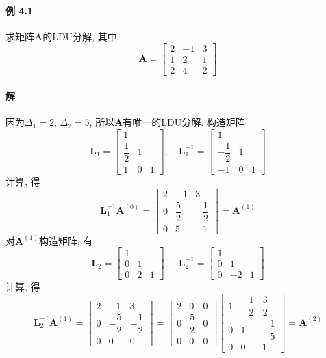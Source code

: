 \documentclass[12pt, a4paper, oneside, fontset=none]{ctexart}
\begin{document}
\paragraph*{例 4.1} 求矩阵$\bm{A}$的LDU分解, 其中
\[
    \bm{A} = \begin{bmatrix}
        2 & -1 & 3 \\
        1 & 2  & 1 \\
        2 & 4  & 2
    \end{bmatrix}
\]

\paragraph*{解} 因为$\Delta_1 = 2$, $\Delta_2 = 5$, 所以$\bm{A}$有唯一的LDU分解. 构造矩阵
\[
    \bm{L}_1 = \begin{bmatrix}
        1            &   &   \\
        \dfrac{1}{2} & 1 &   \\
        1            & 0 & 1
    \end{bmatrix}, \quad \bm{L}_1^{-1} = \begin{bmatrix}
        1             &   &   \\
        -\dfrac{1}{2} & 1 &   \\
        -1            & 0 & 1
    \end{bmatrix}
\]
计算, 得
\[
    \bm{L}_1^{-1}\bm{A}^{(0)} = \begin{bmatrix}
        2 & -1           & 3             \\
        0 & \dfrac{5}{2} & -\dfrac{1}{2} \\
        0 & 5            & -1
    \end{bmatrix} = \bm{A}^{(1)}
\]
对$\bm{A}^{(1)}$构造矩阵, 有
\[
    \bm{L}_2 = \begin{bmatrix}
        1 &   &   \\
        0 & 1 &   \\
        0 & 2 & 1
    \end{bmatrix}, \quad \bm{L}_2^{-1} = \begin{bmatrix}
        1 &    &   \\
        0 & 1  &   \\
        0 & -2 & 1
    \end{bmatrix}
\]
计算, 得
\[
    \bm{L}_2^{-1}\bm{A}^{(1)} = \begin{bmatrix}
        2 & -1            & 3             \\
        0 & -\dfrac{5}{2} & -\dfrac{1}{2} \\
        0 & 0             & 0
    \end{bmatrix} = \begin{bmatrix}
        2 & 0            & 0 \\
        0 & \dfrac{5}{2} & 0 \\
        0 & 0            & 0
    \end{bmatrix}\begin{bmatrix}
        1 & -\dfrac{1}{2} & \dfrac{3}{2}  \\
        0 & 1             & -\dfrac{1}{5} \\
        0 & 0             & 1
    \end{bmatrix} = \bm{A}^{(2)}
\]
\end{document}
